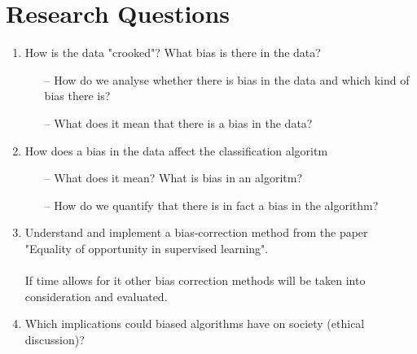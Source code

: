 \documentclass[11pt, fleqn]{article}
\begin{document}
	\section*{Research Questions}
	\begin{enumerate}
		\item How is the data "crooked"? What bias is there in the data?
		\begin{itemize}
			\item[--] How do we analyse whether there is bias in the data and which kind of bias there is? 
			\item[--] What does it mean that there is a bias in the data?
		\end{itemize}
		
		\item How does a bias in the data affect the classification algoritm
		\begin{itemize}
			\item[--] What does it mean? What is bias in an algoritm?
			\item[--] How do we quantify that there is in fact a bias in the algorithm?
		\end{itemize}
		
		\item Understand and implement a bias-correction method from the paper "Equality of opportunity in supervised learning". \\\\  If time allows for it other bias correction methods will be taken into consideration and evaluated.
		
		\item Which implications could biased algorithms have on society (ethical discussion)?
		
	\end{enumerate}
	
\end{document}
